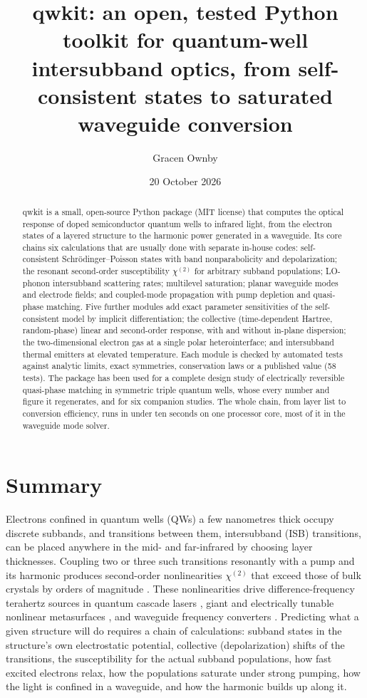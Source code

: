 \documentclass[11pt]{article}
\title{qwkit: an open, tested Python toolkit for quantum-well intersubband optics, from self-consistent states to saturated waveguide conversion}
\author{Gracen Ownby}
\affil{University of Oklahoma, Norman, Oklahoma, USA}
\date{\small 20 October 2026}
\newcommand{\chitwo}{\chi^{(2)}}
\begin{document}
\maketitle

\begin{abstract}
qwkit is a small, open-source Python package (MIT license) that computes the optical response of doped semiconductor quantum wells to infrared light, from the electron states of a layered structure to the harmonic power generated in a waveguide. Its core chains six calculations that are usually done with separate in-house codes: self-consistent Schr\"odinger--Poisson states with band nonparabolicity and depolarization; the resonant second-order susceptibility $\chitwo$ for arbitrary subband populations; LO-phonon intersubband scattering rates; multilevel saturation; planar waveguide modes and electrode fields; and coupled-mode propagation with pump depletion and quasi-phase matching. Five further modules add exact parameter sensitivities of the self-consistent model by implicit differentiation; the collective (time-dependent Hartree, random-phase) linear and second-order response, with and without in-plane dispersion; the two-dimensional electron gas at a single polar heterointerface; and intersubband thermal emitters at elevated temperature. Each module is checked by automated tests against analytic limits, exact symmetries, conservation laws or a published value (58 tests). The package has been used for a complete design study of electrically reversible quasi-phase matching in symmetric triple quantum wells, whose every number and figure it regenerates, and for six companion studies. The whole chain, from layer list to conversion efficiency, runs in under ten seconds on one processor core, most of it in the waveguide mode solver.
\end{abstract}

\section{Summary}
Electrons confined in quantum wells (QWs) a few nanometres thick occupy discrete subbands, and transitions between them, intersubband (ISB) transitions, can be placed anywhere in the mid- and far-infrared by choosing layer thicknesses. Coupling two or three such transitions resonantly with a pump and its harmonic produces second-order nonlinearities $\chitwo$ that exceed those of bulk crystals by orders of magnitude \cite{Fejer1989,Rosencher1991,Vurgaftman2021}. These nonlinearities drive difference-frequency terahertz sources in quantum cascade lasers \cite{Belkin2007}, giant and electrically tunable nonlinear metasurfaces \cite{Lee2014,Yu2022}, and waveguide frequency converters \cite{Chesi2023}. Predicting what a given structure will do requires a chain of calculations: subband states in the structure's own electrostatic potential, collective (depolarization) shifts of the transitions, the susceptibility for the actual subband populations, how fast excited electrons relax, how the populations saturate under strong pumping, how the light is confined in a waveguide, and how the harmonic builds up along it.
\end{document}
